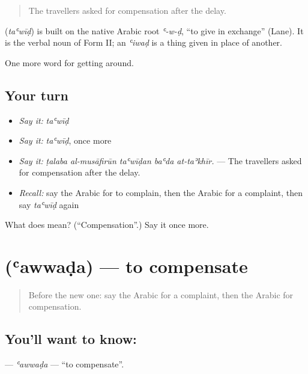 \begin{quote}
The travellers asked for compensation after the delay.
\end{quote}

\begin{cousinweb}
\textbf{} (\emph{taʿwīḍ}) is built on the native Arabic root \emph{ʿ-w-ḍ}, \textquotedblleft{}to give in exchange\textquotedblright{} (Lane). It is the verbal noun of Form II; an \emph{ʿiwaḍ} is a thing given in place of another.
\end{cousinweb}

\begin{grammarlens}[title={What you've built}]
One more word for getting around.
\end{grammarlens}

\subsection*{Your turn}
\begin{itemize}
\raggedright
  \item \emph{Say it:} \emph{taʿwīḍ}
  \item \emph{Say it:} \emph{taʿwīḍ}, once more
  \item \emph{Say it:} \emph{ṭalaba al-musāfirūn taʿwīḍan baʿda at-taʾkhīr.} — The travellers asked for compensation after the delay.
  \item \emph{Recall:} say the Arabic for to complain, then the Arabic for a complaint, then say \emph{taʿwīḍ} again
\end{itemize}

\begin{tcolorbox}[breakable,colback=teal!4,colframe=teal!35!black,title={Before you move on}]
What does  mean? (\textquotedblleft{}Compensation\textquotedblright{}.) Say it once more.
\end{tcolorbox}
\section[\texorpdfstring{\ar{عوض} (ʿawwaḍa)}{عوض (ʿawwaḍa)}]{ (ʿawwaḍa) — to compensate}

\label{lesson:AR-C449-awwada}



\begin{quote}
Before the new one: say the Arabic for a complaint, then the Arabic for compensation.
\end{quote}

\subsection*{You'll want to know: }
\textbf{} — \emph{ʿawwaḍa} — \textquotedblleft{}to compensate\textquotedblright{}.

